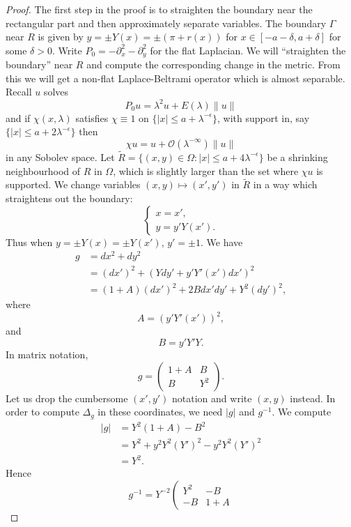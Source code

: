 \documentclass[twoside, final]{amsart}
\theoremstyle{definition}
\numberwithin{equation}{section}
\begin{document}
\begin{proof}

The first step in the proof is to straighten the boundary near
the rectangular part and then approximately separate variables.  The
boundary $\Gamma$ near $R$ is given by $y = \pm Y(x) = \pm ( \pi +
r(x) )$ for $x \in [-a-\delta, a + \delta]$ for some $\delta>0$.
Write $P_0 = -{\partial}_x^2 -{\partial}_y^2$ for the flat Laplacian.  We will
``straighten the boundary'' near $R$ and compute the corresponding
change in the metric.  From this we will get a non-flat
Laplace-Beltrami operator which is almost separable.  Recall $u$
solves
\[
P_0 u = \lambda^2 u + E(\lambda) \| u \|
\]
and if $\chi(x, \lambda)$ satisfies $\chi \equiv 1$ on $\{ | x | {\leqslant}
a + \lambda^{-\epsilon} \}$, with support in, say $\{ | x | {\leqslant} a + 2
\lambda^{-\epsilon} \}$ then
\[
\chi u = u + {{\mathcal O}}(\lambda^{-\infty}) \| u \| 
\]
in any Sobolev space.  Let ${\tilde{R}} = \{ (x, y) \in \Omega : | x | {\leqslant} a
+ 4 \lambda^{-\epsilon} \}$ be a shrinking neighbourhood of $R$ in
$\Omega$, which is slightly larger than the set where $\chi u$ is supported.  We
change variables $(x, y) \mapsto (x', y')$  in ${\tilde{R}}$ in a way which straightens out the
boundary:
\[
\begin{cases}
x = x', \\
y =  y' Y(x').
\end{cases}
\]
Thus when $y = \pm Y(x) = \pm Y(x')$, $y' = \pm 1$.  We have
\begin{align*}
g & = dx^2 + dy^2 \\
& = (dx')^2 + (Y dy' + y' Y'(x') dx')^2 \\
& = (1 + A)(dx')^2 + 2B dx' dy' + Y^2 (dy')^2,
\end{align*}
where 
\[
A = (y' Y'(x'))^2,
\]
and
\[
B = y' Y' Y.
\]
In matrix notation, 
\[
g = \left( \begin{array}{cc} 1 + A & B \\ B &  Y^2 \end{array}
\right).
\]
Let us drop the cumbersome $(x', y')$ notation and write $(x,y)$
instead.  In order to compute $\Delta_g$ in these coordinates, we need
$| g|$ and $g^{-1}$.  We compute
\begin{align*}
| g | & = Y^2 (1 + A) - B^2 \\
& = Y^2 + y^2 Y^2 (Y')^2 - y^2 Y^2 (Y')^2 \\
& = Y^2.
\end{align*}
Hence
\[
g^{-1} = Y^{-2} \left( \begin{array}{cc} Y^2 & - B \\ -B &  1 + A \end{array}
\]
\end{proof}
\end{document}
